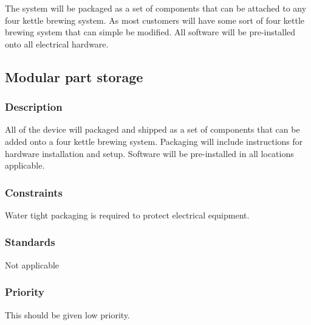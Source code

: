 The system will be packaged as a set of components that can be attached to any four kettle brewing system. As most customers will have some sort of four kettle brewing system that can simple be modified. All software will be pre-installed onto all electrical hardware.

\subsection{Modular part storage}
\subsubsection{Description}
All of the device will packaged and shipped as a set of components that can be added onto a four kettle brewing system. Packaging will include instructions for hardware installation and setup. Software will be pre-installed in all locations applicable.
\subsubsection{Constraints}
Water tight packaging is required to protect electrical equipment. 
\subsubsection{Standards}
Not applicable
\subsubsection{Priority}
This should be given low priority.
